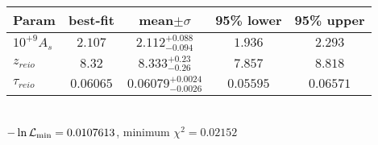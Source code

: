 \begin{tabular}{|l|c|c|c|c|} 
 \hline 
Param & best-fit & mean$\pm\sigma$ & 95\% lower & 95\% upper \\ \hline 
$10^{+9}A_{s }$ &$2.107$ & $2.112_{-0.094}^{+0.088}$ & $1.936$ & $2.293$ \\ 
$z_{reio }$ &$8.32$ & $8.333_{-0.26}^{+0.23}$ & $7.857$ & $8.818$ \\ 
$\tau{}_{reio }$ &$0.06065$ & $0.06079_{-0.0026}^{+0.0024}$ & $0.05595$ & $0.06571$ \\ 
\hline 
 \end{tabular} \\ 
$-\ln{\cal L}_\mathrm{min} =0.0107613$, minimum $\chi^2=0.02152$ \\ 
